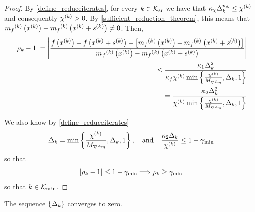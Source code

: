 \begin{proof}
By \cref{define_reduceiterates}, for every $k \in {\mathcal K_{\textrm{sr}}}$ we have that $\kappa_{\chi}\Delta_k^{p_{\Delta}} \le {\chi^{(k)}}$ and consequently ${\chi^{(k)}} > 0$.
By \cref{sufficient_reduction_theorem}, this means that ${{m}_f}^{(k)}\left(x^{(k)}\right) - {{m}_f}^{(k)}\left(x^{(k)} + {{s}^{(k)}}\right) \ne 0$.
Then,
\begin{align*}
\left|\rho_k - 1\right| 
= \left|\frac
{f\left(x^{(k)}\right) - f\left(x^{(k)} + {{s}^{(k)}}\right) - \left[{{m}_f}^{(k)}\left(x^{(k)}\right) - {{m}_f}^{(k)}\left(x^{(k)} + {{s}^{(k)}}\right)\right]}
{{{m}_f}^{(k)}\left(x^{(k)}\right) - {{m}_f}^{(k)}\left(x^{(k)} + {{s}^{(k)}}\right)} \right| \\
\le \frac {{\kappa_1} \Delta_k^2} {\kappa_f {\chi^{(k)}} \min\left\{\frac{{\chi^{(k)}}}{{M_{\nabla^2 m}}}, \Delta_k, 1\right\}} \\
= \frac {{\kappa_2} \Delta_k^2} {{\chi^{(k)}} \min\left\{\frac{{\chi^{(k)}}}{{M_{\nabla^2 m}}}, \Delta_k, 1\right\}}
\end{align*}

We also know by \cref{define_reduceiterates}
\begin{align*}
\Delta_k = \min\left\{\frac {{\chi^{(k)}}} {{M_{\nabla^2 m}}}, \Delta_k, 1 \right\}, \quad \textrm{and} \quad
\frac {{\kappa_2} \Delta_k}{{\chi^{(k)}}} \le 1 - \gamma_{\textrm{min}}
\end{align*}
so that
\begin{align*}
\left|\rho_k - 1\right| \le 1 - \gamma_{\textrm{min}}
\Longrightarrow \rho_k \ge \gamma_{\textrm{min}}
\end{align*}
so that $k \in {\mathcal K_{\textrm{min}}}$.
\end{proof}


% 

\begin{lemma}
\label{delta_to_zero}



The sequence $\left\{\Delta_k\right\}$ converges to zero.
\end{lemma}

